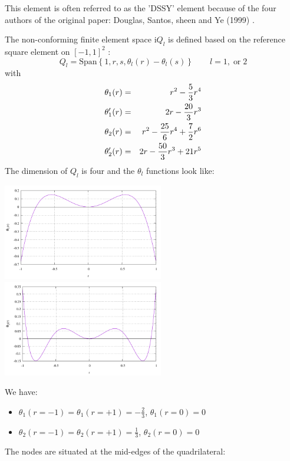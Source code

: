 This element is often referred to as the 'DSSY' element because of the 
four authors of the original paper: Douglas, Santos, sheen and Ye (1999) \cite{doss99}.

The non-conforming finite element space i$Q_l$ is defined based on the 
reference square element on $[-1,1]^2$ :
\[
Q_l = \text{Span} \left\{ 1, r, s, \theta_l(r)-\theta_l(s)  \right\}
\qquad l=1,\; \text{or} \; 2
\]
with
\begin{eqnarray}
\theta_1(r)  &=& r^2-\frac53r^4  \nonumber\\
\theta_1'(r) &=& 2r-\frac{20}{3}r^3  \nonumber\\
\theta_2(r)  &=& r^2-\frac{25}{6} r^4 + \frac72 r^6 \\ 
\theta_2'(r) &=& 2r-\frac{50}{3} r^3 + 21 r^5
\end{eqnarray}
The dimension of $Q_l$ is four and the $\theta_l$ functions look like:
\begin{center}
\includegraphics[width=7cm]{images/dssy/theta1}
\includegraphics[width=7cm]{images/dssy/theta2}
\end{center}
We have:
\begin{itemize}
\item $\theta_1(r=-1)=\theta_1(r=+1)=-\frac23$, $\theta_1(r=0)=0$ 
\item $\theta_2(r=-1)=\theta_2(r=+1)=\frac13$, $\theta_2(r=0)=0$ 
\end{itemize}
The nodes are situated at the mid-edges of the quadrilateral:




